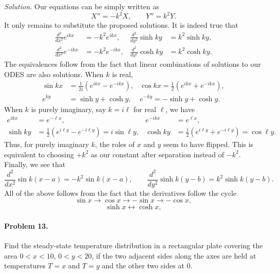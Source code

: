 \documentclass[10pt]{article}
\newcommand\dd[3][]{\frac{d^{#1}{#2}}{d {#3}^{#1}}}
\begin{document}
        \textit{Solution.} Our equations can be simply written as 
        \[
                X'' = -k^2 X, \quad\quad Y'' = k^2 Y.
        \]
        It only remains to substitute the proposed solutions. It is indeed true that
        \begin{align*}
                \dd[2]{}{x}e^{ikx} &= -k^2 e^{ikx}, & \dd[2]{}{y}\sinh{ky} &= k^2\sinh{ky}, \\
                \dd[2]{}{x}e^{-ikx} &= -k^2 e^{-ikx}, & \dd[2]{}{y}\cosh{ky} &= k^2\cosh{ky}.
        \end{align*}
        The equivalences follow from the fact that linear combinations of solutions to our ODES are also solutions.
        When $k$ is real,
        \begin{align*}
                \sin{kx} &= \frac{1}{2i}(e^{ikx} - e^{-ikx}), & \cos{kx} = \frac{1}{2}(e^{ikx} + e^{-ikx}), \\
                e^{ky} &= \sinh{y} + \cosh{y}, & e^{-ky} = -\sinh{y} + \cosh{y}.
        \end{align*}
        When $k$ is purely imaginary, say $k = i\ell$ for real $\ell$, we have
        \begin{align*}
                e^{ikx} &= e^{-\ell x}, & e^{-ikx} &= e^{\ell x}, \\
                \sinh{ky} &= \frac{1}{2}(e^{i\ell y} - e^{-i\ell y}) = i\sin{\ell y}, & 
                        \cosh{ky} &= \frac{1}{2}(e^{i\ell y} + e^{-i\ell y}) = \cos{\ell y}.
        \end{align*}
        Thus, for purely imaginary $k$, the roles of $x$ and $y$ seem to have flipped. This is equivalent to choosing $+k^2$
        as our constant after separation instead of $-k^2$.
        Finally, we see that
        \[
                \dd[2]{}{x}\sin{k(x - a)} = -k^2\sin{k(x - a)}, \quad\quad \dd[2]{}{y}\sinh{k(y - b)} = k^2\sinh{k(y - b)}.
        \]
        All of the above follows from the fact that the derivatives follow the cycle
        \[
                \sin{x} \rightarrow \cos{x} \rightarrow -\sin{x} \rightarrow -\cos{x},
        \]
        \[
                \sinh{x} \leftrightarrow \cosh{x},
        \]
        
        \clearpage
        \paragraph{Problem 13.} Find the steady-state temperature distribution in a rectangular plate covering the area $0 < x < 10$, $0 < y < 20$,
        if the two adjacent sides along the axes are held at temperatures $T = x$ and $T = y$ and the other two sides at $0$. \\
\end{document}
